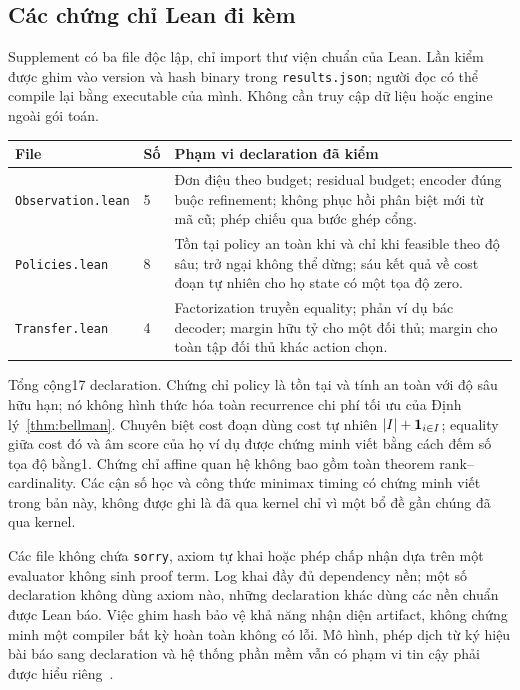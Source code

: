 \subsection{Các chứng chỉ Lean đi kèm}
Supplement có ba file độc lập, chỉ import thư viện chuẩn của Lean. Lần kiểm được ghim vào version và hash binary trong \texttt{results.json}; người đọc có thể compile lại bằng executable của mình. Không cần truy cập dữ liệu hoặc engine ngoài gói toán.
\begin{longtable}{p{}p{}p{}}
\toprule File & Số & Phạm vi declaration đã kiểm\\\midrule\endhead
\texttt{Observation.lean} &5& Đơn điệu theo budget; residual budget; encoder đúng buộc refinement; không phục hồi phân biệt mới từ mã cũ; phép chiếu qua bước ghép cổng.\\
\texttt{Policies.lean} &8& Tồn tại policy an toàn khi và chỉ khi feasible theo độ sâu; trở ngại không thể dừng; sáu kết quả về cost đoạn tự nhiên cho họ state có một tọa độ zero.\\
\texttt{Transfer.lean} &4& Factorization truyền equality; phản ví dụ bác decoder; margin hữu tỷ cho một đối thủ; margin cho toàn tập đối thủ khác action chọn.\\
\bottomrule
\end{longtable}
Tổng cộng17 declaration. Chứng chỉ policy là tồn tại và tính an toàn với độ sâu hữu hạn; nó không hình thức hóa toàn recurrence chi phí tối ưu của Định lý~\ref{thm:bellman}. Chuyên biệt cost đoạn dùng cost tự nhiên $|I|+\mathbf 1_{i\in I}$; equality giữa cost đó và âm score của họ ví dụ được chứng minh viết bằng cách đếm số tọa độ bằng1. Chứng chỉ affine quan hệ không bao gồm toàn theorem rank--cardinality. Các cận số học và công thức minimax timing có chứng minh viết trong bản này, không được ghi là đã qua kernel chỉ vì một bổ đề gần chúng đã qua kernel.

Các file không chứa \texttt{sorry}, axiom tự khai hoặc phép chấp nhận dựa trên một evaluator không sinh proof term. Log khai đầy đủ dependency nền; một số declaration không dùng axiom nào, những declaration khác dùng các nền chuẩn được Lean báo. Việc ghim hash bảo vệ khả năng nhận diện artifact, không chứng minh một compiler bất kỳ hoàn toàn không có lỗi. Mô hình, phép dịch từ ký hiệu bài báo sang declaration và hệ thống phần mềm vẫn có phạm vi tin cậy phải được hiểu riêng~\cite{lean}.

